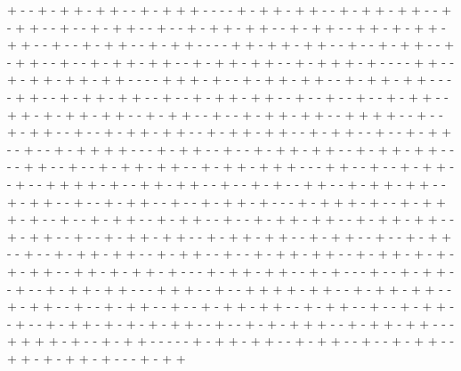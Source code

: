 + - - + - + + - + + - - + - + + + - - - - + - + + - + + - - + - + + - + + - - + - + + - - + - - + - + + - - + - - + - + + - + + - - + - + + - - + + - + - + + - + + - - + - - + - + + - - + - + + - - - - + + - + + - + + - - + - - + - + + - - + - + + - - + - - + - + + - + + - - + - + + - + + - - + - + + + - + - - - - + + - - + - + + - + + - + + - - - - + + + - + - - + - + + - + + - - + - + + - + + - - - - + + - - + - + + - + + - - + - - + - + + - + + - - + - - + - - + - - + - + + - - + + - + - + + - + + - - + - + + - - + - - + - + + - + + - - + + + + - - + - - + - + + - - + - - + - + + - + + - - + - + + - + + - - + - + + - - + - - + - + + - - + - - + - + + + + - - - + - + + - - + - - + - + + - + + - - + - + + - + + - - - - + + - - + - - + - + + - + + - - + - + + - + + + - - - + + - - + - - + - + + - - + - - + + + + - + - - + + - + + - - + - - + - + - - + + - - + - + + - + + - - + - + + - - + - - + - + + - - + - - + - + + - + - - - + - + + + - + - - + - + + + - + - - + - - + - + + - - + - + + - - + - - + - + + - + + - - + - + + - + + - - + - + + - - + - - + - + + - + + - - + - + + - + + - - + - + + - - + - - + - + + - - + - - + - + + - + + - - + - + + - - + - - + - + + - + + - - + - + + - + - + - + - + + - - + + - + - + + - + - - - + - + + - + + - - + - + - - - + - - + - + + - - + - - + - + + - + + - - - + + + - - + - - + + + + - + + - - + - + + - + + - - + - + + - - + - - + - + + - - + - - + - + + - + + - - + - + + - - + - - + - + + - - + - - + - + + - + - + - + - + + - - + - - + - + - + + + - - + - + + - + + - - - + + + + - + - - + - + + - - - - - + - + + - + + - - + - + + - - + - - + - + + - - + + - + - + + - + - - - + - + + 

